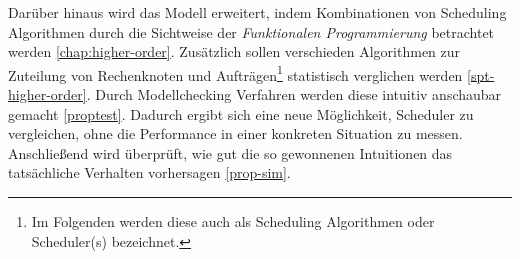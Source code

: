 Darüber hinaus wird das Modell erweitert, indem Kombinationen von Scheduling Algorithmen durch die Sichtweise der \emph{Funktionalen Programmierung} betrachtet werden \ref{chap:higher-order}.
Zusätzlich sollen verschieden Algorithmen zur Zuteilung von Rechenknoten und Aufträgen\footnote{Im Folgenden werden diese auch als Scheduling Algorithmen oder Scheduler(s) bezeichnet.} statistisch verglichen werden \ref{spt-higher-order}. Durch Modellchecking Verfahren werden diese intuitiv anschaubar gemacht \ref{proptest}. Dadurch ergibt sich eine neue Möglichkeit, Scheduler zu vergleichen, ohne die Performance in einer konkreten Situation zu messen. Anschließend wird überprüft, wie gut die so gewonnenen Intuitionen das tatsächliche Verhalten vorhersagen \ref{prop-sim}.\\



